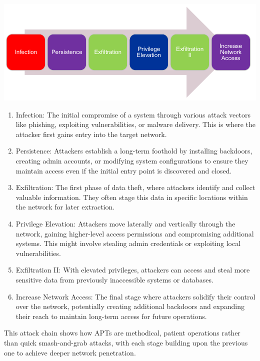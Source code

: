 \begin{center}
    \includegraphics[scale=0.5]{resources/02-apt-02.png}
\end{center}
\begin{enumerate}
	\item Infection: The initial compromise of a system through various attack vectors like phishing, exploiting vulnerabilities, or malware delivery. This is where the attacker first gains entry into the target network.
	\item Persistence: Attackers establish a long-term foothold by installing backdoors, creating admin accounts, or modifying system configurations to ensure they maintain access even if the initial entry point is discovered and closed.
	\item Exfiltration: The first phase of data theft, where attackers identify and collect valuable information. They often stage this data in specific locations within the network for later extraction.
	\item Privilege Elevation: Attackers move laterally and vertically through the network, gaining higher-level access permissions and compromising additional systems. This might involve stealing admin credentials or exploiting local vulnerabilities.
	\item Exfiltration II: With elevated privileges, attackers can access and steal more sensitive data from previously inaccessible systems or databases.
	\item Increase Network Access: The final stage where attackers solidify their control over the network, potentially creating additional backdoors and expanding their reach to maintain long-term access for future operations.
\end{enumerate}

This attack chain shows how APTs are methodical, patient operations rather than quick smash-and-grab attacks, with each stage building upon the previous one to achieve deeper network penetration.

